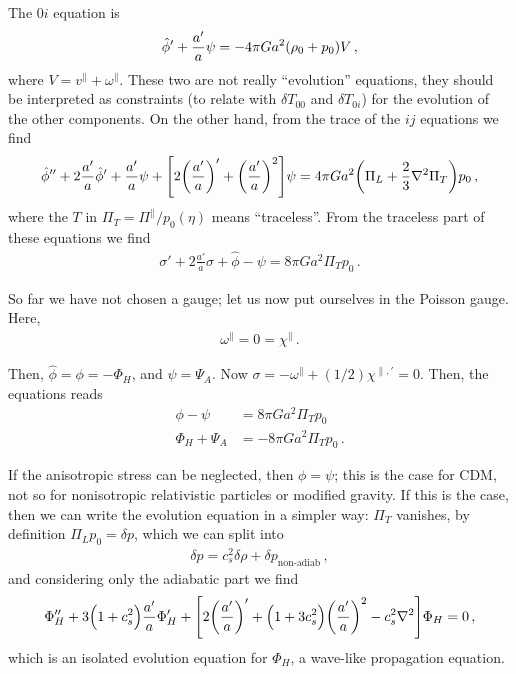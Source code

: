 \documentclass[main.tex]{subfiles}
\begin{document}
The \(0i\) equation is 
%
\begin{align}
\hat{\phi}' + \frac{a'}{a} \psi = - 4 \pi G a^2 \qty(\rho_0 + p_0 )V
\,,
\end{align}
%
where \(V = v^{\parallel} + \omega^{\parallel}\). 
These two are not really ``evolution'' equations, they should be interpreted as constraints (to relate with \(\delta T_{00} \) and \(\delta T_{0i}\)) for the evolution of the other components. 
On the other hand, from the trace of the \(ij\) equations we find 
%
\begin{align}
\hat{\phi}'' + 2 \frac{a'}{a} \hat{\phi}' + \frac{a'}{a} \psi +
\qty[2 \qty(\frac{a'}{a})' + \qty(\frac{a'}{a})^2] \psi 
= 4 \pi G a^2 \qty(\Pi _L + \frac{2}{3} \nabla^2 \Pi _T)p_0 
\,,
\end{align}
%
where the \(T\) in \(\Pi _T = \Pi^{\parallel} / p_0 (\eta )\) means ``traceless''. 
From the traceless part of these equations we find 
%
\begin{align}
\sigma ' + 2 \frac{a'}{a} \sigma + \hat{\phi} - \psi = 8 \pi G a^2 \Pi _T p_0 
\,.
\end{align}

So far we have not chosen a gauge; let us now put ourselves in the Poisson gauge. Here, 
%
\begin{align}
\omega^{\parallel} = 0 = \chi^{\parallel}
\,.
\end{align}

Then, \(\hat{\phi} = \phi = - \Phi _H\), and \(\psi = \Psi _A\). 
Now \(\sigma = - \omega^{\parallel} + (1/2) \chi^{\parallel, \prime} = 0\). 
Then, the equations reads 
%
\begin{align}
\phi - \psi &= 8 \pi G a^2 \Pi_T p_0  \\
\Phi _H + \Psi _A  &= - 8 \pi G a^2 \Pi _T  p_0 
\,.
\end{align}

If the anisotropic stress can be neglected, then \(\phi = \psi \); this is the case for CDM, not so for nonisotropic relativistic particles or modified gravity. 
If this is the case, then we can write the evolution equation in a simpler way: \(\Pi _T\) vanishes, by definition \(\Pi _L p_0 = \delta p\), which we can split into 
%
\begin{align}
\delta p = c_s^2 \delta \rho + \delta p _{\text{non-adiab}}
\,,
\end{align}
%
and considering only the adiabatic part we find 
%
\begin{align}
\Phi _H'' + 3 \qty(1 + c_s^2) \frac{a'}{a} \Phi _H' + 
\qty[2 \qty(\frac{a'}{a})' + \qty(1 + 3 c_s^2) \qty(\frac{a'}{a})^2
- c_s^2 \nabla^2] \Phi _H = 0
\,,
\end{align}
%
which is an isolated evolution equation for \(\Phi _H\), a wave-like propagation equation. 
\end{document}
